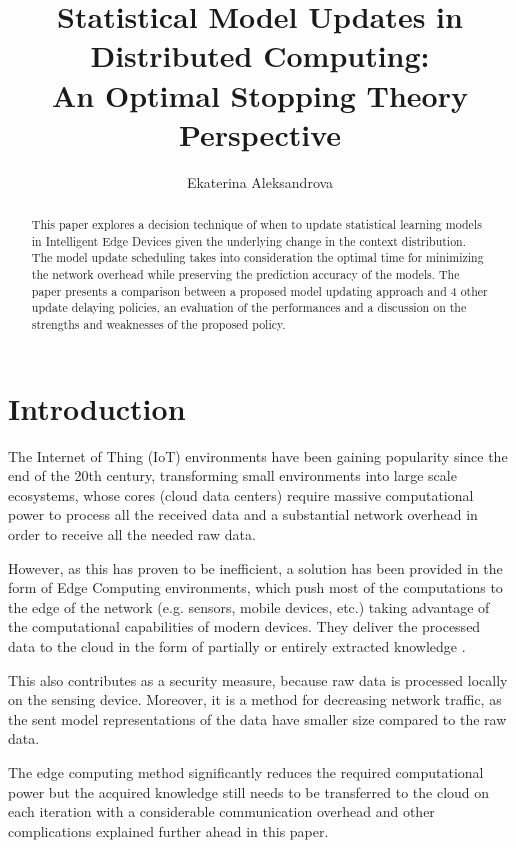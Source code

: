 \documentclass{mpaper}
\begin{document}
\title{Statistical Model Updates in Distributed Computing:\\ An Optimal Stopping Theory Perspective}
\author{Ekaterina Aleksandrova}

\maketitle

\begin{abstract}
This paper explores a decision technique of when to update statistical learning models in Intelligent Edge Devices given the underlying change in the context distribution. The model update scheduling takes into consideration the optimal time for minimizing the network overhead while preserving the prediction accuracy of the models. The paper presents a comparison between a proposed model updating approach and 4 other update delaying policies, an evaluation of the performances and a discussion on the strengths and weaknesses of the proposed policy.
\end{abstract}

\section{Introduction}

The Internet of Thing (IoT) environments have been gaining popularity since the end of the 20th century, transforming small environments into large scale ecosystems, 
whose cores (cloud data centers) require massive computational 
power to process all the received data and a substantial network overhead in order to receive all the needed raw data.

However, as this has proven to be inefficient, a solution has been provided in the form of Edge Computing environments, which push most of the computations to the edge of the network (e.g. sensors, mobile devices, etc.) taking advantage of the computational capabilities of modern devices. They deliver the processed data to the cloud in the form of partially or entirely extracted knowledge \cite{anagnostop2014}.

This also contributes as a security measure, because raw data is processed locally on the sensing device. Moreover, it is a method for decreasing network traffic, as the sent model representations of the data have smaller size compared to the raw data.

The edge computing method significantly reduces the required computational power but the acquired knowledge still needs to be transferred to the cloud on each iteration with a considerable communication overhead and other complications explained further ahead in this paper. 
\end{document}
